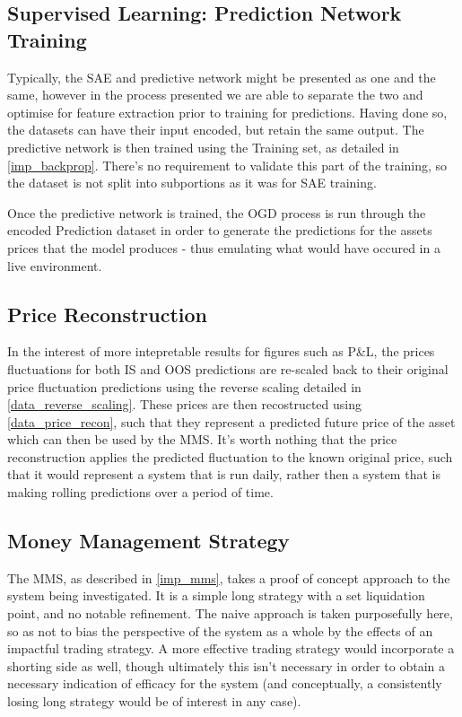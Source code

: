 \documentclass[a4paper,11pt,oneside]{article}
\theoremstyle{plain}
\theoremstyle{definition}
\begin{document}
	\subsection{Supervised Learning: Prediction Network Training}\label{proc_predictionnetwork}
	
	Typically, the SAE and predictive network might be presented as one and the same, however in the process presented we are able to separate the two and optimise for feature extraction prior to training for predictions. Having done so, the datasets can have their input encoded, but retain the same output. The predictive network is then trained using the Training set, as detailed in \ref{imp_backprop}. There's no requirement to validate this part of the training, so the dataset is not split into subportions as it was for SAE training. \newline
	
	Once the predictive network is trained, the OGD process is run through the encoded Prediction dataset in order to generate the predictions for the assets prices that the model produces - thus emulating what would have occured in a live environment. \newline
	
	\subsection{Price Reconstruction}\label{proc_precerecon}
	
	In the interest of more intepretable results for figures such as P\&L, the prices fluctuations for both IS and OOS predictions are re-scaled back to their original price fluctuation predictions using the reverse scaling detailed in \ref{data_reverse_scaling}. These prices are then recostructed using \ref{data_price_recon}, such that they represent a predicted future price of the asset which can then be used by the MMS. It's worth nothing that the price reconstruction applies the predicted fluctuation to the known original price, such that it would represent a system that is run daily, rather then a system that is making rolling predictions over a period of time. 
	
	\subsection{Money Management Strategy}\label{proc_mms}
	
	The MMS, as described in \ref{imp_mms}, takes a proof of concept approach to the system being investigated. It is a simple long strategy with a set liquidation point, and no notable refinement. The naive approach is taken purposefully here, so as not to bias the perspective of the system as a whole by the effects of an impactful trading strategy. A more effective trading strategy would incorporate a shorting side as well, though ultimately this isn't necessary in order to obtain a necessary indication of efficacy for the system (and conceptually, a consistently losing long strategy would be of interest in any case).  \newline
	
\end{document}
